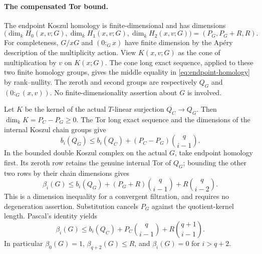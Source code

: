\paragraph{The compensated Tor bound.}
The endpoint Koszul homology is finite-dimensional and has dimensions
\begin{equation}\label{eq:endpoint-homology}
 \bigl(\dim_k H_0(x,v;G),\dim_k H_1(x,v;G),
       \dim_k H_2(x,v;G)\bigr)=(P_G,P_G+R,R).
\end{equation}
For completeness, $G/xG$ and $(0:_Gx)$ have finite dimension by the
Ap\'ery description of the multiplicity action. View
$K(x,v;G)$ as the cone of multiplication by $v$ on $K(x;G)$.
The cone long exact sequence, applied to these two finite homology
groups, gives the middle equality in \eqref{eq:endpoint-homology} by
rank--nullity. The zeroth and second groups are respectively $Q_G$ and
$(0:_G(x,v))$. No finite-dimensionality assertion about $G$ is involved.

Let $K$ be the kernel of the actual $T$-linear surjection $Q_C\to Q_G$.
Then $\dim_k K=P_C-P_G\ge0$. The Tor long exact sequence and the
dimensions of the internal Koszul chain groups give
\[
 b_i(Q_G)\le b_i(Q_C)+(P_C-P_G)\binom q{i-1}.
\]
In the bounded double Koszul complex on the actual $G$, take endpoint
homology first. Its zeroth row retains the genuine internal Tor of
$Q_G$; bounding the other two rows by their chain dimensions gives
\[
 \beta_i(G)\le b_i(Q_G)+(P_G+R)\binom q{i-1}
                              +R\binom q{i-2}.
\]
This is a dimension inequality for a convergent filtration, and requires
no degeneration assertion. Substitution cancels $P_G$ against the
quotient-kernel length. Pascal's identity yields
\begin{equation}\label{eq:endpoint-bound}
 \boxed{\displaystyle
 \beta_i(G)\le b_i(Q_C)+P_C\binom q{i-1}
                              +R\binom{q+1}{i-1}.}
\end{equation}
In particular $\beta_0(G)=1$, $\beta_{q+2}(G)\le R$, and
$\beta_i(G)=0$ for $i>q+2$.

